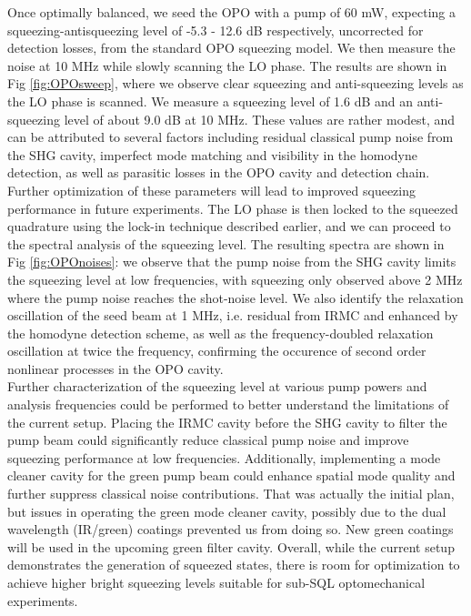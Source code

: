 Once optimally balanced, we seed the OPO with a pump of 60 mW, expecting a squeezing-antisqueezing level of -5.3 - 12.6 dB respectively, uncorrected for detection losses, from the standard OPO squeezing model. We then measure the noise at 10 MHz while slowly scanning the LO phase. The results are shown in Fig \ref{fig:OPOsweep}, where we observe clear squeezing and anti-squeezing levels as the LO phase is scanned. We measure a squeezing level of 1.6 dB and an anti-squeezing level of about 9.0 dB at 10 MHz. These values are rather modest, and can be attributed to several factors including residual classical pump noise from the SHG cavity, imperfect mode matching and visibility in the homodyne detection, as well as parasitic losses in the OPO cavity and detection chain. Further optimization of these parameters will lead to improved squeezing performance in future experiments. The LO phase is then locked to the squeezed quadrature using the lock-in technique described earlier, and we can proceed to the spectral analysis of the squeezing level. The resulting spectra are shown in Fig \ref{fig:OPOnoises}: we observe that the pump noise from the SHG cavity limits the squeezing level at low frequencies, with squeezing only observed above 2 MHz where the pump noise reaches the shot-noise level. We also identify the relaxation oscillation of the seed beam at 1 MHz, i.e. residual from IRMC and enhanced by the homodyne detection scheme, as well as the frequency-doubled relaxation oscillation at twice the frequency, confirming the occurence of second order nonlinear processes in the OPO cavity. \\

Further characterization of the squeezing level at various pump powers and analysis frequencies could be performed to better understand the limitations of the current setup. Placing the IRMC cavity before the SHG cavity to filter the pump beam could significantly reduce classical pump noise and improve squeezing performance at low frequencies. Additionally, implementing a mode cleaner cavity for the green pump beam could enhance spatial mode quality and further suppress classical noise contributions. That was actually the initial plan, but issues in operating the green mode cleaner cavity, possibly due to the dual wavelength (IR/green) coatings prevented us from doing so. New green coatings will be used in the upcoming green filter cavity. Overall, while the current setup demonstrates the generation of squeezed states, there is room for optimization to achieve higher bright squeezing levels suitable for sub-SQL optomechanical experiments. 


